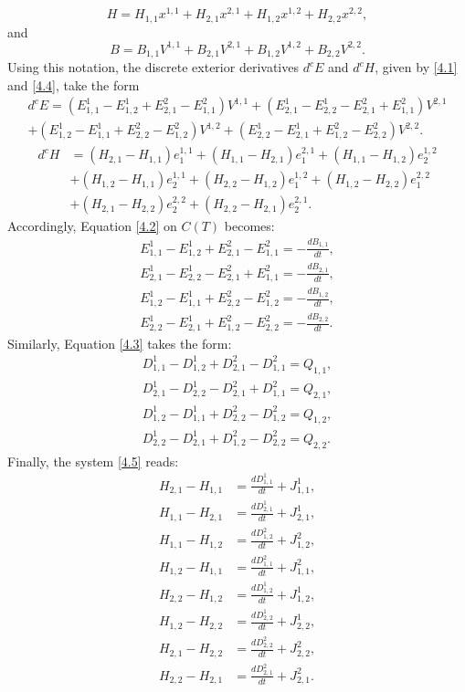 \documentclass[english]{article}
\theoremstyle{plain}
\theoremstyle{definition}
\theoremstyle{remark}
\numberwithin{equation}{section}
\begin{document}
\begin{equation*}\label{}
     H=H_{1,1}x^{1,1}+H_{2,1}x^{2,1}+H_{1,2}x^{1,2}+H_{2,2}x^{2,2},
\end{equation*}
and
\begin{equation*}\label{}
     B=B_{1,1}V^{1,1}+B_{2,1}V^{2,1}+B_{1,2}V^{1,2}+B_{2,2}V^{2,2}.
\end{equation*}
Using this notation, the discrete exterior derivatives $d^cE$ and  $d^cH$, given by \eqref{4.1} and \eqref{4.4},
 take the form
\begin{align*}\label{}
 d^cE=(E^1_{1,1}-E^1_{1,2}+E^2_{2,1}-E^2_{1,1})V^{1,1}+(E^1_{2,1}-E^1_{2,2}-E^2_{2,1}+E^2_{1,1})V^{2,1}\nonumber\\
  +(E^1_{1,2}-E^1_{1,1}+E^2_{2,2}-E^2_{1,2})V^{1,2}+(E^1_{2,2}-E^1_{2,1}+E^2_{1,2}-E^2_{2,2})V^{2,2}.
\end{align*}
\begin{align*}\label{}
  d^cH&=(H_{2,1}-H_{1,1})e_1^{1,1}+(H_{1,1}-H_{2,1})e_1^{2,1}+(H_{1,1}-H_{1,2})e_2^{1,2}\nonumber\\
  &+(H_{1,2}-H_{1,1})e_2^{1,1}+(H_{2,2}-H_{1,2})e_1^{1,2}+(H_{1,2}-H_{2,2})e_1^{2,2}
  \nonumber\\
  &+(H_{2,1}-H_{2,2})e_2^{2,2}+(H_{2,2}-H_{2,1})e_2^{2,1}.
\end{align*}
Accordingly, Equation \eqref{4.2} on $C(T)$ becomes:
\begin{align}\label{4.11}
 E^1_{1,1}-E^1_{1,2}+E^2_{2,1}-E^2_{1,1}=-\frac{dB_{1,1}}{dt}, \nonumber \\
 E^1_{2,1}-E^1_{2,2}-E^2_{2,1}+E^2_{1,1}=-\frac{dB_{2,1}}{dt}, \nonumber\\
 E^1_{1,2}-E^1_{1,1}+E^2_{2,2}-E^2_{1,2}=-\frac{dB_{1,2}}{dt}, \nonumber  \\
 E^1_{2,2}-E^1_{2,1}+E^2_{1,2}-E^2_{2,2}=-\frac{dB_{2,2}}{dt}.
\end{align}
Similarly, Equation \eqref{4.3} takes the form:
\begin{align}\label{4.12}
 D^1_{1,1}-D^1_{1,2}+D^2_{2,1}-D^2_{1,1}=Q_{1,1}, \nonumber \\
 D^1_{2,1}-D^1_{2,2}-D^2_{2,1}+D^2_{1,1}=Q_{2,1}, \nonumber \\
 D^1_{1,2}-D^1_{1,1}+D^2_{2,2}-D^2_{1,2}=Q_{1,2}, \nonumber \\
 D^1_{2,2}-D^1_{2,1}+D^2_{1,2}-D^2_{2,2}=Q_{2,2}.
\end{align}
Finally, the system \eqref{4.5} reads:
\begin{align}\label{4.13}
H_{2,1}-H_{1,1}&=\frac{dD^1_{1,1}}{dt}+J^1_{1,1}, \nonumber \\
 H_{1,1}-H_{2,1}&=\frac{dD^1_{2,1}}{dt}+J^1_{2,1}, \nonumber \\
 H_{1,1}-H_{1,2}&=\frac{dD^2_{1,2}}{dt}+J^2_{1,2}, \nonumber \\
H_{1,2}-H_{1,1}&=\frac{dD^2_{1,1}}{dt}+J^2_{1,1}, \nonumber \\
H_{2,2}-H_{1,2}&=\frac{dD^1_{1,2}}{dt}+J^1_{1,2}, \nonumber \\
H_{1,2}-H_{2,2}&=\frac{dD^1_{2,2}}{dt}+J^1_{2,2}, \nonumber \\
H_{2,1}-H_{2,2}&=\frac{dD^2_{2,2}}{dt}+J^2_{2,2}, \nonumber \\
H_{2,2}-H_{2,1}&=\frac{dD^2_{2,1}}{dt}+J^2_{2,1}.
\end{align}
\end{document}
